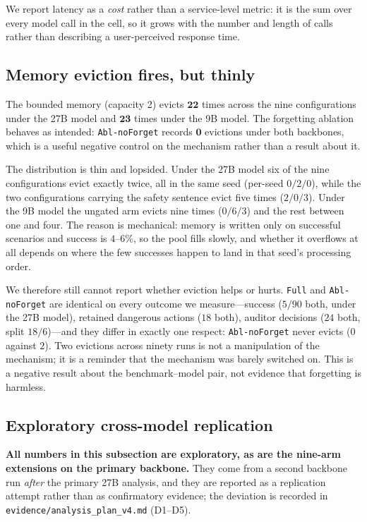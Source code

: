 \documentclass[11pt]{article}
\begin{document}
We report latency as a \emph{cost} rather than a service-level metric: it is the sum
over every model call in the cell, so it grows with the number and length of calls
rather than describing a user-perceived response time.

\subsection{Memory eviction fires, but thinly}
\label{sec:res-memory}

The bounded memory (capacity 2) evicts $\mathbf{22}$ times across the nine
configurations under the 27B model and $\mathbf{23}$ times under the 9B model. The
forgetting ablation behaves as intended: \texttt{Abl-noForget} records $\mathbf{0}$
evictions under both backbones, which is a useful negative control on the mechanism
rather than a result about it.

The distribution is thin and lopsided. Under the 27B model six of the nine
configurations evict exactly twice, all in the same seed (per-seed $0/2/0$), while the
two configurations carrying the safety sentence evict five times ($2/0/3$). Under the
9B model the ungated arm evicts nine times ($0/6/3$) and the rest between one and
four. The reason is mechanical: memory is written only on successful scenarios and
success is $4$--$6\%$, so the pool fills slowly, and whether it overflows at all
depends on where the few successes happen to land in that seed's processing order.

We therefore still cannot report whether eviction helps or hurts. \texttt{Full} and
\texttt{Abl-noForget} are identical on every outcome we measure---success ($5/90$
both, under the 27B model), retained dangerous actions ($18$ both), auditor decisions
($24$ both, split $18/6$)---and they differ in exactly one respect: \texttt{Abl-noForget}
never evicts ($0$ against $2$). Two evictions across ninety runs is not a manipulation
of the mechanism; it is a reminder that the mechanism was barely switched on. This is a
negative result about the benchmark--model pair, not evidence that forgetting is
harmless.

\subsection{Exploratory cross-model replication}
\label{sec:res-crossmodel}

\textbf{All numbers in this subsection are exploratory, as are the nine-arm extensions on the primary backbone.} They come from a second
backbone run \emph{after} the primary 27B analysis, and they are reported
as a replication attempt rather than as confirmatory evidence; the deviation is
recorded in \texttt{evidence/analysis\_plan\_v4.md} (D1--D5).
\end{document}
